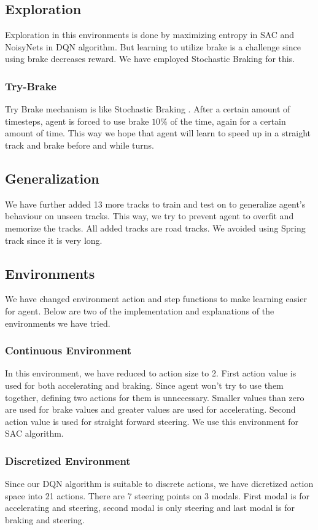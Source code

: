 \documentclass[conference]{IEEEtran}
\begin{document}
\subsection{Exploration}
Exploration in this environments is done by maximizing entropy in SAC and NoisyNets in DQN algorithm. But learning to utilize brake is a challenge since using brake decreases reward. We have employed Stochastic Braking for this.

\subsubsection{Try-Brake}
Try Brake mechanism is like Stochastic Braking \cite{deeprltorcs}. After a certain amount of timesteps, agent is forced to use brake $10\%$ of the time, again for a certain amount of time. This way we hope that agent will learn to speed up in a straight track and brake before and while turns.

\subsection{Generalization}
We have further added 13 more tracks to train and test on to generalize agent's behaviour on unseen tracks. This way, we try to prevent agent to overfit and memorize the tracks. All added tracks are road tracks. We avoided using Spring track since it is very long.

\subsection{Environments}
We have changed environment action and step functions to make learning easier for agent. Below are two of the implementation and explanations of the environments we have tried.

\subsubsection{Continuous Environment}
In this environment, we have reduced to action size to 2. First action value is used for both accelerating and braking. Since agent won't try to use them together, defining two actions for them is unnecessary. Smaller values than zero are used for brake values and greater values are used for accelerating. Second action value is used for straight forward steering. We use this environment for SAC algorithm.

\subsubsection{Discretized Environment}
Since our DQN algorithm is suitable to discrete actions, we have dicretized action space into 21 actions. There are 7 steering points on 3 modals. First modal is for accelerating and steering, second modal is only steering and last modal is for braking and steering.
\end{document}
